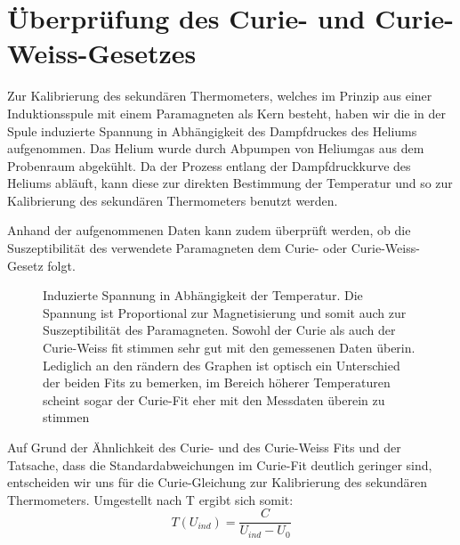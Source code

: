 \documentclass[bigchapter,colorback,accentcolor=tud4b,linedtoc,11pt]{tudreport}
\begin{document}
\section{Überprüfung des Curie- und Curie-Weiss-Gesetzes}
Zur Kalibrierung des sekundären Thermometers, welches im Prinzip aus einer
Induktionsspule mit einem Paramagneten als Kern besteht, haben wir die in der
Spule induzierte Spannung in Abhängigkeit des Dampfdruckes des Heliums
aufgenommen. Das Helium wurde durch Abpumpen von Heliumgas aus dem Probenraum
abgekühlt. Da der Prozess entlang der Dampfdruckkurve des Heliums abläuft, kann
diese zur direkten Bestimmung der Temperatur und so zur Kalibrierung des
sekundären Thermometers benutzt werden.

Anhand der aufgenommenen Daten kann zudem überprüft werden, ob die Suszeptibilität
des verwendete Paramagneten dem Curie- oder Curie-Weiss-Gesetz folgt.
\begin{figure}[H]
    \caption{Induzierte Spannung in Abhängigkeit der Temperatur. Die Spannung
        ist Proportional zur Magnetisierung und somit auch zur Suszeptibilität des
        Paramagneten. Sowohl der Curie als auch der Curie-Weiss fit stimmen sehr gut
        mit den gemessenen Daten überin. Lediglich an den rändern des Graphen ist
        optisch ein Unterschied der beiden Fits zu bemerken, im Bereich höherer
        Temperaturen scheint sogar der Curie-Fit eher mit den Messdaten überein zu stimmen}
\end{figure}

Auf Grund der Ähnlichkeit des Curie- und des Curie-Weiss Fits und der Tatsache,
dass die Standardabweichungen im Curie-Fit deutlich geringer sind, entscheiden wir
uns für die Curie-Gleichung zur Kalibrierung des sekundären
Thermometers. Umgestellt nach T ergibt sich somit:
$$T(U_{ind}) = \frac{C}{U_{ind}-U_0}$$ 
\end{document}
